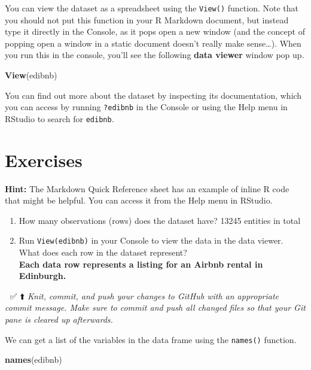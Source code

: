 \documentclass[
]{article}
\newenvironment{Shaded}{\begin{snugshade}}{\end{snugshade}}
\newcommand{\FunctionTok}[1]{\textcolor[rgb]{0.13,0.29,0.53}{\textbf{#1}}}
\newcommand{\NormalTok}[1]{#1}
\begin{document}
You can view the dataset as a spreadsheet using the \texttt{View()}
function. Note that you should not put this function in your R Markdown
document, but instead type it directly in the Console, as it pops open a
new window (and the concept of popping open a window in a static
document doesn't really make sense\ldots). When you run this in the
console, you'll see the following \textbf{data viewer} window pop up.

\begin{Shaded}
\begin{Highlighting}[]
\FunctionTok{View}\NormalTok{(edibnb)}
\end{Highlighting}
\end{Shaded}

You can find out more about the dataset by inspecting its documentation,
which you can access by running \texttt{?edibnb} in the Console or using
the Help menu in RStudio to search for \texttt{edibnb}.

\section{Exercises}\label{exercises}

\begin{marginnote}
\textbf{Hint:} The Markdown Quick Reference sheet has an example of
inline R code that might be helpful. You can access it from the Help
menu in RStudio.
\end{marginnote}

\begin{enumerate}
\def\labelenumi{\arabic{enumi}.}
\item
  How many observations (rows) does the dataset have? 13245 entities in
  total
\item
  Run \texttt{View(edibnb)} in your Console to view the data in the data
  viewer. What does each row in the dataset represent?\\
  \textbf{Each data row represents a listing for an Airbnb rental in
  Edinburgh.}
\end{enumerate}

🧶 ✅ ⬆️ \emph{Knit,} \emph{commit, and push your changes to GitHub with
an appropriate commit message. Make sure to commit and push all changed
files so that your Git pane is cleared up afterwards.}

We can get a list of the variables in the data frame using the
\texttt{names()} function.

\begin{Shaded}
\begin{Highlighting}[]
\FunctionTok{names}\NormalTok{(edibnb)}
\end{Highlighting}
\end{Shaded}
\end{document}
